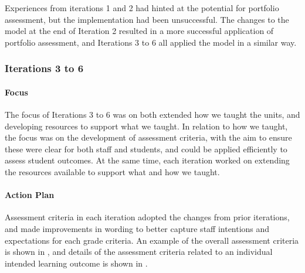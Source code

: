 Experiences from iterations 1 and 2 had hinted at the potential for portfolio assessment, but the implementation had been unsuccessful. The changes to the model at the end of Iteration 2 resulted in a more successful application of portfolio assessment, and Iterations 3 to 6 all applied the model in a similar way. 

\subsubsection{Iterations 3 to 6} %
\label{ssub:iterations_3_to_6}

\paragraph{Focus} %
\label{ssub:focus_3_6}

The focus of Iterations 3 to 6 was on both extended how we taught the units, and developing resources to support what we taught. In relation to how we taught, the focus was on the development of assessment criteria, with the aim to ensure these were clear for both staff and students, and could be applied efficiently to assess student outcomes. At the same time, each iteration worked on extending the resources available to support what and how we taught.


\paragraph{Action Plan} %
\label{ssub:plan_3_6}

Assessment criteria in each iteration adopted the changes from prior iterations, and made improvements in wording to better capture staff intentions and expectations for each grade criteria. An example of the overall assessment criteria is shown in , and details of the assessment criteria related to an individual intended learning outcome is shown in .

